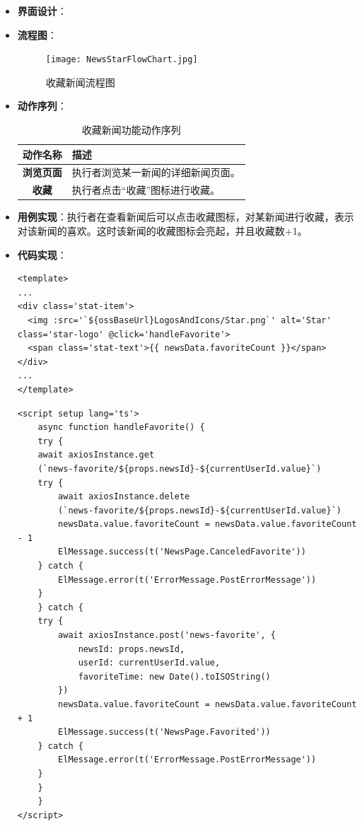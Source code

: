 \begin{itemize}
	\item \textbf{界面设计}：
	\item \textbf{流程图}：
	\begin{figure}[H]
		\centering
		\texttt{[image: NewsStarFlowChart.jpg]}
		\caption{收藏新闻流程图}
		\label{NewsStarFlowChart}
	\end{figure}
	\item \textbf{动作序列}：
	\begin{table}[H]
		\centering
		\caption{收藏新闻功能动作序列}
		\renewcommand\arraystretch{1.5}
		\begin{tabular}{|c|>{\raggedright\arraybackslash}p{10cm}|}
			\hline
			\textbf{动作名称} & \textbf{描述} \\ \hline
			\textbf{浏览页面} & 执行者浏览某一新闻的详细新闻页面。 \\ \hline
			\textbf{收藏} & 执行者点击“收藏”图标进行收藏。 \\ \hline
		\end{tabular}
	\end{table}
	\item \textbf{用例实现}：执行者在查看新闻后可以点击收藏图标，对某新闻进行收藏，表示对该新闻的喜欢。这时该新闻的收藏图标会亮起，并且收藏数+1。
	\item \textbf{代码实现}：
	\begin{verbatim}
<template>
...
<div class='stat-item'>
  <img :src='`${ossBaseUrl}LogosAndIcons/Star.png`' alt='Star' class='star-logo' @click='handleFavorite'>
  <span class='stat-text'>{{ newsData.favoriteCount }}</span>
</div>
...
</template>
	\end{verbatim}
	
	\begin{verbatim}
<script setup lang='ts'>
	async function handleFavorite() {
	try {
	await axiosInstance.get
	(`news-favorite/${props.newsId}-${currentUserId.value}`)
	try {
		await axiosInstance.delete
		(`news-favorite/${props.newsId}-${currentUserId.value}`)
		newsData.value.favoriteCount = newsData.value.favoriteCount - 1
		ElMessage.success(t('NewsPage.CanceledFavorite'))
	} catch {
		ElMessage.error(t('ErrorMessage.PostErrorMessage'))
	}
	} catch {
	try {
		await axiosInstance.post('news-favorite', {
			newsId: props.newsId,
			userId: currentUserId.value,
			favoriteTime: new Date().toISOString()
		})
		newsData.value.favoriteCount = newsData.value.favoriteCount + 1
		ElMessage.success(t('NewsPage.Favorited'))
	} catch {
		ElMessage.error(t('ErrorMessage.PostErrorMessage'))
	}
	}
	}
</script>
	\end{verbatim}
\end{itemize}

